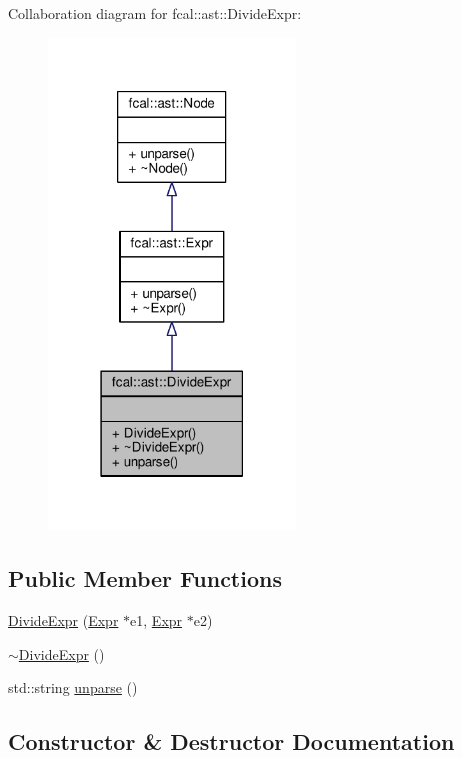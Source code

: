 Collaboration diagram for fcal\+:\+:ast\+:\+:Divide\+Expr\+:
\nopagebreak
\begin{figure}[H]
\begin{center}
\leavevmode
\includegraphics[width=186pt]{classfcal_1_1ast_1_1DivideExpr__coll__graph}
\end{center}
\end{figure}
\subsection*{Public Member Functions}
\begin{DoxyCompactItemize}
\item 
\hyperlink{classfcal_1_1ast_1_1DivideExpr_aedb4be7c3db38ae966d4a71765edaf85}{Divide\+Expr} (\hyperlink{classfcal_1_1ast_1_1Expr}{Expr} $\ast$e1, \hyperlink{classfcal_1_1ast_1_1Expr}{Expr} $\ast$e2)
\item 
\hyperlink{classfcal_1_1ast_1_1DivideExpr_a8a6e2087688a3570b9e3e7b1aaba93ef}{$\sim$\+Divide\+Expr} ()
\item 
std\+::string \hyperlink{classfcal_1_1ast_1_1DivideExpr_aa9ffeb0bd5a526ca75deacc31882f833}{unparse} ()
\end{DoxyCompactItemize}


\subsection{Constructor \& Destructor Documentation}
